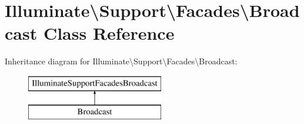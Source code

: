 \hypertarget{class_illuminate_1_1_support_1_1_facades_1_1_broadcast}{}\section{Illuminate\textbackslash{}Support\textbackslash{}Facades\textbackslash{}Broadcast Class Reference}
\label{class_illuminate_1_1_support_1_1_facades_1_1_broadcast}
Inheritance diagram for Illuminate\textbackslash{}Support\textbackslash{}Facades\textbackslash{}Broadcast\+:\begin{figure}[H]
\begin{center}
\leavevmode
\includegraphics[height=2.000000cm]{class_illuminate_1_1_support_1_1_facades_1_1_broadcast}
\end{center}
\end{figure}
